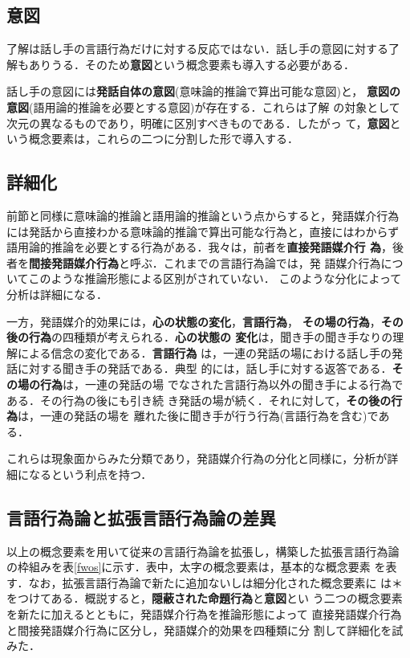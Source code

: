 \subsection{意図}

了解は話し手の言語行為だけに対する反応ではない．話し手の意図に対する了
解もありうる．そのため{\bf 意図}という概念要素も導入する必要がある．

話し手の意図には{\bf 発話自体の意図}(意味論的推論で算出可能な意図)と，
{\bf 意図の意図}(語用論的推論を必要とする意図)が存在する．これらは了解
の対象として次元の異なるものであり，明確に区別すべきものである．したがっ
て，{\bf 意図}という概念要素は，これらの二つに分割した形で導入する．

\subsection{詳細化}

前節と同様に意味論的推論と語用論的推論という点からすると，発語媒介行為
には発話から直接わかる意味論的推論で算出可能な行為と，直接にはわからず
語用論的推論を必要とする行為がある．我々は，前者を{\bf 直接発語媒介行
為}，後者を{\bf 間接発語媒介行為}と呼ぶ．これまでの言語行為論では，発
語媒介行為についてこのような推論形態による区別がされていない．
このような分化によって分析は詳細になる．

一方，発語媒介的効果には，{\bf 心の状態の変化}，{\bf 言語行為}，{\bf 
その場の行為}，{\bf その後の行為}の四種類が考えられる．{\bf 心の状態の
変化}は，聞き手の聞き手なりの理解による信念の変化である．{\bf 言語行為}
は，一連の発話の場における話し手の発話に対する聞き手の発話である．典型
的には，話し手に対する返答である．{\bf その場の行為}は，一連の発話の場
でなされた言語行為以外の聞き手による行為である．その行為の後にも引き続
き発話の場が続く．それに対して，{\bf その後の行為}は，一連の発話の場を
離れた後に聞き手が行う行為(言語行為を含む)である．

これらは現象面からみた分類であり，発語媒介行為の分化と同様に，分析が詳
細になるという利点を持つ．

\subsection{言語行為論と拡張言語行為論の差異}

以上の概念要素を用いて従来の言語行為論を拡張し，構築した拡張言語行為論
の枠組みを表\ref{fwos}に示す．表中，太字の概念要素は，基本的な概念要素
を表す．なお，拡張言語行為論で新たに追加ないしは細分化された概念要素に
は＊をつけてある．概説すると，{\bf 隠蔽された命題行為}と{\bf 意図}とい
う二つの概念要素を新たに加えるとともに，発語媒介行為を推論形態によって
直接発語媒介行為と間接発語媒介行為に区分し，発語媒介的効果を四種類に分
割して詳細化を試みた．

